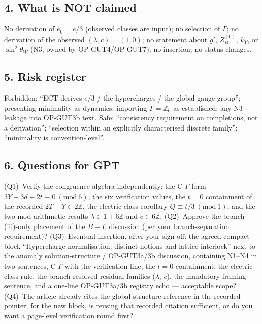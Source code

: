 \subsection*{4. What is NOT claimed}
No derivation of $e_0=e/3$ (observed classes are input); no
selection of $\Gamma$; no derivation of the observed
$(\lambda,c)=(1,0)$; no statement about $g'$, $Z_B^{(0)}$, $k_Y$,
or $\sin^2\theta_W$ (N3, owned by OP-GUT4/OP-GUT7); no insertion;
no status changes.

\subsection*{5. Risk register}
Forbidden: ``ECT derives $e/3$ / the hypercharges / the global
gauge group''; presenting minimality as dynamics; importing
$\Gamma=\mathbb Z_6$ as established; any N3 leakage into
OP-GUT3b text.
Safe: ``consistency requirement on completions, not a
derivation''; ``selection within an explicitly characterised
discrete family''; ``minimality is convention-level''.

\subsection*{6. Questions for GPT}
(Q1)~Verify the congruence algebra independently: the C-$\Gamma$
form $3Y+3d+2t\equiv0\ (\mathrm{mod}\ 6)$, the six verification
values, the $t=0$ containment of the recorded $2T+Y\in2\mathbb Z$,
the electric-class corollary $Q\equiv t/3\ (\mathrm{mod}\ 1)$,
and the two mod-arithmetic results $\lambda\in1+6\mathbb Z$ and
$c\in6\mathbb Z$.
(Q2)~Approve the branch-(iii)-only placement of the $B{-}L$
discussion (per your branch-separation requirement)?
(Q3)~Eventual insertion, after your sign-off: the agreed compact
block ``Hypercharge normalisation: distinct notions and lattice
interlock'' next to the anomaly solution-structure /
OP-GUT3a/3b discussion, containing N1--N4 in two sentences,
C-$\Gamma$ with the verification line, the $t=0$ containment,
the electric-class rule, the branch-resolved residual families
($\lambda$, $c$), the mandatory framing sentence, and a one-line
OP-GUT3a/3b registry echo --- acceptable scope?
(Q4)~The article already cites the global-structure reference in
the recorded pointer; for the new block, is reusing that recorded
citation sufficient, or do you want a page-level verification
round first?
